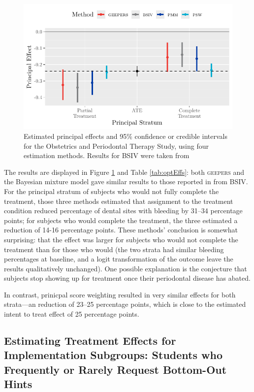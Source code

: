 \documentclass[]{article}
\begin{document}
\begin{figure}
  \centering
  \includegraphics{../figure/opts.pdf}
  \caption{Estimated principal effects and 95\% confidence or credible intervals for the Obstetrics and Periodontal Therapy Study, using four estimation methods. Results for BSIV were taken from \citet{richardson2023estimating}}
  \label{fig:opt}
\end{figure}


The results are displayed in Figure \ref{fig:opt} and Table \ref{tab:optEffs}: both \textsc{geepers} and the Bayesian mixture model gave similar results to those reported in \citet{richardson2023estimating} from BSIV.
For the principal stratum of subjects who would not fully complete the treatment, those three methods estimated that assignment to the treatment condition reduced percentage of dental sites with bleeding by 31--34 percentage points; for subjects who would complete the treatment, the three estimated a reduction of 14-16 percentage points.
These methods' conclusion is somewhat surprising: that the effect was larger for subjects who would not complete the treatment than for those who would (the two strata had similar bleeding percentages at baseline, and a logit transformation of the outcome leave the results qualitatively unchanged). 
One possible explanation is the conjecture that subjects stop showing up for treatment once their periodontal disease has abated.

In contrast, prinicpal score weighting resulted in very similar effects for both strata---an reduction of 23--25 percentage points, which is close to the estimated intent to treat effect of 25 percentage points.

\subsection{Estimating Treatment Effects for Implementation Subgroups: Students who Frequently or Rarely Request Bottom-Out Hints}\label{sec:fh2t}
\end{document}
